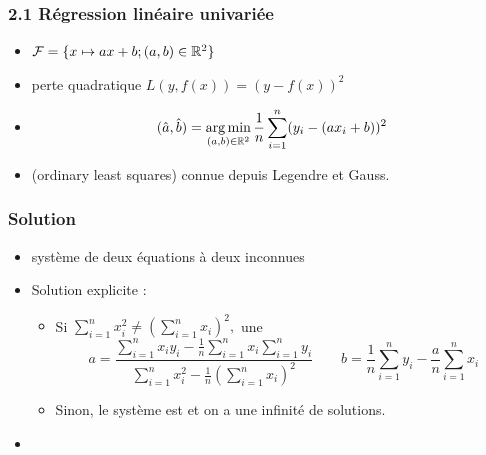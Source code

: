 \begin{frame}
  \frametitle{2.1 Régression linéaire univariée}
  \begin{itemize}
  \item {}  $\mathcal{F} = \{x \mapsto a x + b ; (a, b) \in {\mathbb R}^2\}$ 
    \pause
  \item {} perte quadratique $L(y, f(x)) = (y - f(x))^2$
    \pause
  \item {}
    \[ (\hat{a}, \hat{b}) = \operatorname*{arg\,min}_{(a,b) \in {\mathbb R}^2} \frac1n \sum_{i=1}^n (y_i - (a x_i + b))^2 \]
    \pause
  \item[]  \textcolor{gray!70}{(ordinary least squares)} connue depuis Legendre et Gauss. 
  \end{itemize}
\end{frame}

\begin{frame}
  \frametitle{Solution}
  \begin{itemize}
  \item {} système de deux équations à deux inconnues
  \item[] Solution explicite : 
    \begin{itemize}
    \item Si $\sum_{i=1}^n x_i^2 \neq \left(\sum_{i=1}^n x_i\right)^2,$ une 
      \[ a = \frac{\sum_{i=1}^n x_i y_i - \frac1n \sum_{i=1}^n x_i \sum_{i=1}^n y_i}{
          \sum_{i=1}^n x_i^2 - \frac1n \left(\sum_{i=1}^n x_i\right)^2}  \hspace{2em}
        b = \frac1n \sum_{i=1}^n y_i - \frac{a}{n} \sum_{i=1}^n x_i\]
      \pause
    \item Sinon, le système est  et on a une infinité de solutions.
    \end{itemize}
  \pause
  \item {}
  \end{itemize}
\end{frame}

